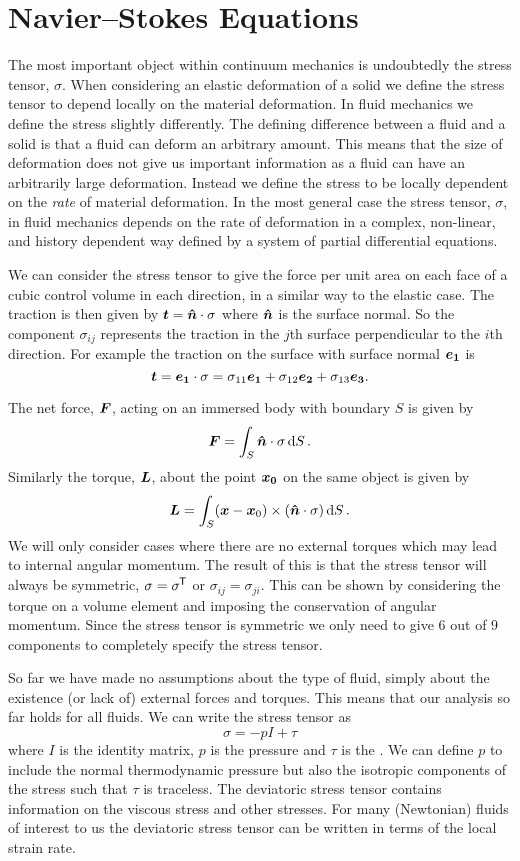\documentclass[a4paper]{article}
\renewcommand{\ident}{I}
\begin{document}
    \section{Navier--Stokes Equations}
    The most important object within continuum mechanics is undoubtedly the stress tensor, \(\sigma\).
    When considering an elastic deformation of a solid we define the stress tensor to depend locally on the material deformation.
    In fluid mechanics we define the stress slightly differently.
    The defining difference between a fluid and a solid is that a fluid can deform an arbitrary amount.
    This means that the size of deformation does not give us important information as a fluid can have an arbitrarily large deformation.
    Instead we define the stress to be locally dependent on the \emph{rate} of material deformation.
    In the most general case the stress tensor, \(\sigma\), in fluid mechanics depends on the rate of deformation in a complex, non-linear, and history dependent way defined by a system of partial differential equations.
    
    We can consider the stress tensor to give the force per unit area on each face of a cubic control volume in each direction, in a similar way to the elastic case.
    The traction is then given by \(\bm{t} = \bm{\hat{n}}\cdot\sigma\) where \(\bm{\hat{n}}\) is the surface normal.
    So the component \(\sigma_{ij}\) represents the traction in the \(j\)th surface perpendicular to the \(i\)th direction.
    For example the traction on the surface with surface normal \(\bm{e_{1}}\) is
    \[\bm{t} = \bm{e_{1}}\cdot\sigma = \sigma_{11}\bm{e_{1}} + \sigma_{12}\bm{e_{2}} + \sigma_{13}\bm{e_{3}}.\]
    
    The net force, \(\bm{F}\), acting on an immersed body with boundary \(S\) is given by
    \[\bm{F} = \int_{S} \bm{\hat{n}}\cdot\sigma \dd{S}.\]
    Similarly the torque, \(\bm{L}\), about the point \(\bm{x_0}\) on the same object is given by
    \[\bm{L} = \int_S (\bm{x} - \bm{x}_0)\times (\bm{\hat{n}}\cdot\sigma)\dd{S}.\]
    We will only consider cases where there are no external torques which may lead to internal angular momentum.
    The result of this is that the stress tensor will always be symmetric, \(\sigma = \sigma^{\mkern-1.5mu\mathsf{T}}\) or \(\sigma_{ij} = \sigma_{ji}\).
    This can be shown by considering the torque on a volume element and imposing the conservation of angular momentum.
    Since the stress tensor is symmetric we only need to give 6 out of 9 components to completely specify the stress tensor.
    
    So far we have made no assumptions about the type of fluid, simply about the existence (or lack of) external forces and torques.
    This means that our analysis so far holds for all fluids.
    We can write the stress tensor as
    \[\sigma = -p\ident + \tau\]
    where \(\ident\) is the identity matrix, \(p\) is the pressure and \(\tau\) is the .
    We can define \(p\) to include the normal thermodynamic pressure but also the isotropic components of the stress such that \(\tau\) is traceless.
    The deviatoric stress tensor contains information on the viscous stress and other stresses.
    For many (Newtonian) fluids of interest to us the deviatoric stress tensor can be written in terms of the local strain rate.
    
\end{document}
